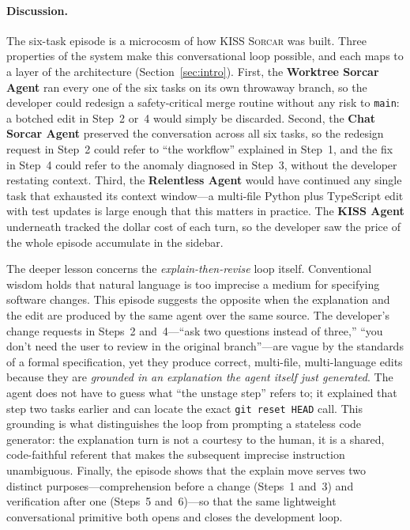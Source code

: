 \documentclass{article}
\newcommand{\kisssys}{\textsc{KISS Sorcar}}
\begin{document}
\paragraph{Discussion.}
The six-task episode is a microcosm of how \kisssys{} was built.
Three properties of the system make this conversational loop possible,
and each maps to a layer of the architecture
(Section~\ref{sec:intro}).
First, the \textbf{Worktree Sorcar Agent} ran every one of the six
tasks on its own throwaway branch, so the developer could redesign a
safety-critical merge routine without any risk to \texttt{main}: a
botched edit in Step~2 or~4 would simply be discarded.
Second, the \textbf{Chat Sorcar Agent} preserved the conversation
across all six tasks, so the redesign request in Step~2 could refer to
``the workflow'' explained in Step~1, and the fix in Step~4 could refer
to the anomaly diagnosed in Step~3, without the developer restating
context.
Third, the \textbf{Relentless Agent} would have continued any single
task that exhausted its context window---a multi-file Python plus
TypeScript edit with test updates is large enough that this matters in
practice.
The \textbf{KISS Agent} underneath tracked the dollar cost of each
turn, so the developer saw the price of the whole episode accumulate in
the sidebar.

The deeper lesson concerns the \emph{explain-then-revise} loop itself.
Conventional wisdom holds that natural language is too imprecise a
medium for specifying software changes.
This episode suggests the opposite when the explanation and the edit
are produced by the same agent over the same source.
The developer's change requests in Steps~2 and~4---``ask two questions
instead of three,'' ``you don't need the user to review in the original
branch''---are vague by the standards of a formal specification, yet
they produce correct, multi-file, multi-language edits because they are
\emph{grounded in an explanation the agent itself just generated}.
The agent does not have to guess what ``the unstage step'' refers to;
it explained that step two tasks earlier and can locate the exact
\texttt{git reset HEAD} call.
This grounding is what distinguishes the loop from prompting a stateless
code generator: the explanation turn is not a courtesy to the human, it
is a shared, code-faithful referent that makes the subsequent
imprecise instruction unambiguous.
Finally, the episode shows that the explain move serves two distinct
purposes---comprehension before a change (Steps~1 and~3) and
verification after one (Steps~5 and~6)---so that the same lightweight
conversational primitive both opens and closes the development loop.
\end{document}
